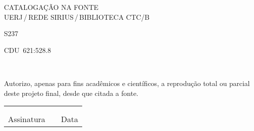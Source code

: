 %
% 


\begin{titlepage}
	\begin{center}
\vfill
\singlespacing
	\vspace*{75mm}
	{CATALOGAÇÃO NA FONTE\\ \vspace{1.5mm}
	UERJ\,/\,REDE SIRIUS\,/\,BIBLIOTECA CTC/B}\\
	\vspace{1.5mm}
	\begin{boxedminipage}{140mm}
	\begin{minipage}{5mm}
		\vspace{-84mm}
		S237
	\end{minipage}
	\hfill
	\vspace*{5mm}
	\begin{flushright}
	 CDU~621:528.8
	\end{flushright}
    \vspace{1mm}
	\end{boxedminipage}\\
	\end{center}
%
	Autorizo, apenas para fins acadêmicos e científicos, a reprodução total ou parcial deste projeto final, desde que citada a fonte.\\
	\noindent
	\begin{tabular}{ccc}
	\phantom{XXXXXXXXXXXXXXXXXXXXXXXXXXXXXX}&	 \phantom{XX}	&	\phantom{XXXXXXXXXXXXXXXX}	\\
	\phantom{XXXXXXXXXXXXXXXXXXXXXXXXXXXXXX}&	 \phantom{XX}	&	\phantom{XXXXXXXXXXXXXXXX}	\\
	\cline{1-1}\cline{3-3}
	Assinatura &		&	Data
	\end{tabular}
\end{titlepage}